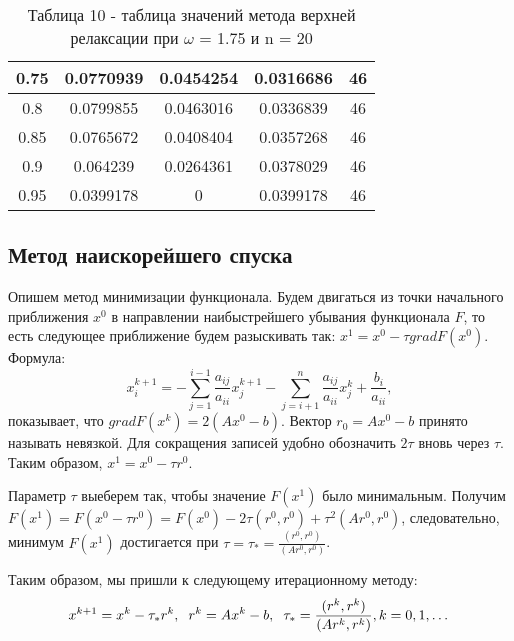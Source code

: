 \documentclass[a4paper,12pt]{article}
\begin{document}
\begin{enumerate}[label = \arabic*.]
{\begin{table}[h]
\begin{tabular}{|c|c|c|c|c|}
          0.75 &    0.0770939 &    0.0454254 &    0.0316686 & 46\\ \hline
          0.8 &    0.0799855 &    0.0463016 &    0.0336839 & 46\\ \hline
          0.85 &    0.0765672 &    0.0408404 &    0.0357268 & 46\\ \hline
          0.9 &     0.064239 &    0.0264361 &    0.0378029 & 46\\ \hline
          0.95 &    0.0399178 &            0 &    0.0399178 & 46\\ \hline
        \end{tabular}
        \caption*{\small{Таблица 10 - таблица значений метода верхней релаксации при $\omega$ = 1.75 и n = 20}}
      \end{table}
  }
\end{enumerate}
\newpage



\subsection{Метод наискорейшего спуска}

\hspace{1cm} Опишем метод минимизации функционала. Будем двигаться из точки начального 
приближения $x^0$ в направлении наибыстрейшего убывания функционала $F$, 
то есть следующее приближение будем разыскивать так:
$x^1 = x^0 - \tau gradF(x^0).$ Формула:
\begin{equation}
  x^{k+1}_i = -\sum\limits_{j = 1}^{i - 1}\frac{a_{ij}}{a_{ii}} x^{k + 1}_j - \sum\limits_{j = i + 1}^{n}\frac{a_{ij}}{a_{ii}} x^k_j + \frac{b_i}{a_{ii}},
\end{equation}
показывает, что $gradF(x^k) = 2(Ax^0 - b)$. Вектор $r_0 = Ax^0 - b$ принято называть невязкой.
Для сокращения записей удобно обозначить  $2\tau$ вновь через $\tau$. Таким образом, 
$x^1 = x^0 - \tau r^0$.

Параметр $\tau$ выеберем так, чтобы значение $F(x^1)$ было минимальным. 
Получим $F(x^1) = F(x^0 - \tau r^0) = F(x^0) - 2\tau(r^0, r^0) + \tau^2(Ar^0, r^0)$, следовательно,
минимум $F(x^1)$ достигается при $\tau = \tau_* = \frac{(r^0, r^0)}{(Ar^0, r^0)}$.

Таким образом, мы пришли к следующему итерационному методу:
\begin{equation}
  x^{k + 1} = x^k - \tau_* r^k, \hspace{0.2cm} r^k = Ax^k - b, \hspace{0.2cm} \tau_* = \frac{(r^k, r^k)}{(Ar^k, r^k)}, k = 0, 1, \dots
\end{equation}
\end{document}

